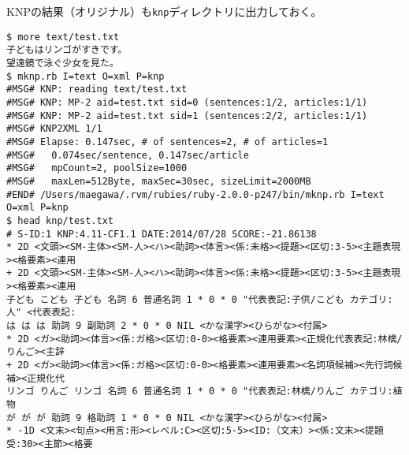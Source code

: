 KNPの結果（オリジナル）も\verb|knp|ディレクトリに出力しておく。


\begin{Verbatim}[baselinestretch=0.7,frame=single]
$ more text/test.txt
子どもはリンゴがすきです。
望遠鏡で泳ぐ少女を見た。
$ mknp.rb I=text O=xml P=knp
#MSG# KNP: reading text/test.txt
#MSG# KNP: MP-2 aid=test.txt sid=0 (sentences:1/2, articles:1/1)
#MSG# KNP: MP-2 aid=test.txt sid=1 (sentences:2/2, articles:1/1)
#MSG# KNP2XML 1/1
#MSG# Elapse: 0.147sec, # of sentences=2, # of articles=1
#MSG#   0.074sec/sentence, 0.147sec/article
#MSG#   mpCount=2, poolSize=1000
#MSG#   maxLen=512Byte, maxSec=30sec, sizeLimit=2000MB
#END# /Users/maegawa/.rvm/rubies/ruby-2.0.0-p247/bin/mknp.rb I=text O=xml P=knp
$ head knp/test.txt
# S-ID:1 KNP:4.11-CF1.1 DATE:2014/07/28 SCORE:-21.86138
* 2D <文頭><SM-主体><SM-人><ハ><助詞><体言><係:未格><提題><区切:3-5><主題表現><格要素><連用
+ 2D <文頭><SM-主体><SM-人><ハ><助詞><体言><係:未格><提題><区切:3-5><主題表現><格要素><連用
子ども こども 子ども 名詞 6 普通名詞 1 * 0 * 0 "代表表記:子供/こども カテゴリ:人" <代表表記:
は は は 助詞 9 副助詞 2 * 0 * 0 NIL <かな漢字><ひらがな><付属>
* 2D <ガ><助詞><体言><係:ガ格><区切:0-0><格要素><連用要素><正規化代表表記:林檎/りんご><主辞
+ 2D <ガ><助詞><体言><係:ガ格><区切:0-0><格要素><連用要素><名詞項候補><先行詞候補><正規化代
リンゴ りんご リンゴ 名詞 6 普通名詞 1 * 0 * 0 "代表表記:林檎/りんご カテゴリ:植物
が が が 助詞 9 格助詞 1 * 0 * 0 NIL <かな漢字><ひらがな><付属>
* -1D <文末><句点><用言:形><レベル:C><区切:5-5><ID:（文末）><係:文末><提題受:30><主節><格要
\end{Verbatim}
